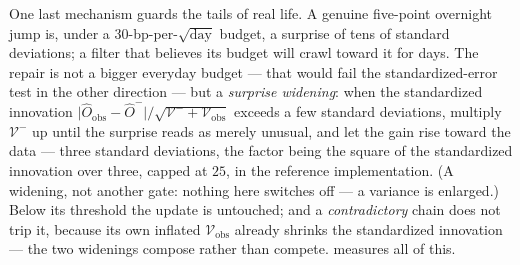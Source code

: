 One last mechanism guards the tails of real life.  A genuine
five-point overnight jump is, under a $30$-bp-per-$\sqrt{\text{day}}$
budget, a surprise of tens of standard deviations; a filter that
believes its budget will crawl toward it for days.  The repair is
not a bigger everyday budget --- that would fail the
standardized-error test in the other direction --- but a
\emph{surprise widening}:
when the standardized innovation
$\lvert\hat O_{\mathrm{obs}}-\hat O^{-}\rvert
/\sqrt{\mathcal{V}^{-}+\mathcal{V}_{\mathrm{obs}}}$ exceeds a few
standard deviations, multiply $\mathcal{V}^{-}$ up until the
surprise reads as merely unusual, and let the gain rise toward the
data --- three standard deviations, the factor being the square of
the standardized innovation over three, capped at $25$, in the
reference implementation.  (A widening, not
another gate: nothing here switches off ---
a variance is enlarged.)  Below its threshold the update is
untouched; and a \emph{contradictory} chain does not trip it,
because its own inflated $\mathcal{V}_{\mathrm{obs}}$ already
shrinks the standardized innovation --- the two widenings
compose rather than compete.   measures all of
this.
